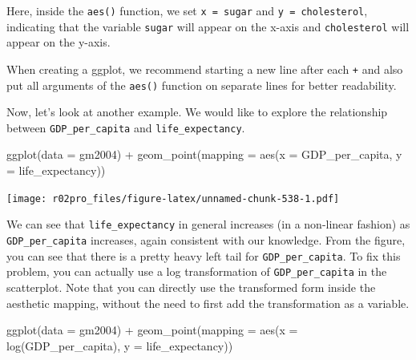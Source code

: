 \documentclass[
]{book}
\newenvironment{Shaded}{\begin{snugshade}}{\end{snugshade}}
\newcommand{\AttributeTok}[1]{\textcolor[rgb]{0.77,0.63,0.00}{#1}}
\newcommand{\FunctionTok}[1]{\textcolor[rgb]{0.00,0.00,0.00}{#1}}
\newcommand{\NormalTok}[1]{#1}
\newcommand{\SpecialCharTok}[1]{\textcolor[rgb]{0.00,0.00,0.00}{#1}}
\newenvironment{blackbox}{
  \definecolor{shadecolor}{rgb}{0, 0, 0}  %
  \color{white}
  \begin{shaded}}
 {\end{shaded}}
\newenvironment{infobox}[1]
  {
  \begin{itemize}
  \renewcommand{\labelitemi}{
    \raisebox{-.7\height}[0pt][0pt]{
      {\setkeys{Gin}{width=3em,keepaspectratio}
        \texttt{[image: pics/\#1]}}
    }
  }
  \setlength{\fboxsep}{1em}
  \begin{blackbox}
  \item
  }
  {
  \end{blackbox}
  \end{itemize}
  }
\begin{document}
Here, inside the \texttt{aes()} function, we set \texttt{x\ =\ sugar} and \texttt{y\ =\ cholesterol}, indicating that the variable \texttt{sugar} will appear on the x-axis and \texttt{cholesterol} will appear on the y-axis.

\begin{infobox}{caution}
When creating a ggplot, we recommend starting a new line after each \texttt{+} and also put all arguments of the \texttt{aes()} function on separate lines for better readability.

\end{infobox}

Now, let's look at another example. We would like to explore the relationship between \texttt{GDP\_per\_capita} and \texttt{life\_expectancy}.

\begin{Shaded}
\begin{Highlighting}[]
\FunctionTok{ggplot}\NormalTok{(}\AttributeTok{data =}\NormalTok{ gm2004) }\SpecialCharTok{+} 
  \FunctionTok{geom\_point}\NormalTok{(}\AttributeTok{mapping =} \FunctionTok{aes}\NormalTok{(}\AttributeTok{x =}\NormalTok{ GDP\_per\_capita, }
                           \AttributeTok{y =}\NormalTok{ life\_expectancy))}
\end{Highlighting}
\end{Shaded}

\texttt{[image: r02pro\_files/figure-latex/unnamed-chunk-538-1.pdf]}

We can see that \texttt{life\_expectancy} in general increases (in a non-linear fashion) as \texttt{GDP\_per\_capita} increases, again consistent with our knowledge. From the figure, you can see that there is a pretty heavy left tail for \texttt{GDP\_per\_capita}. To fix this problem, you can actually use a log transformation of \texttt{GDP\_per\_capita} in the scatterplot. Note that you can directly use the transformed form inside the aesthetic mapping, without the need to first add the transformation as a variable.

\begin{Shaded}
\begin{Highlighting}[]
\FunctionTok{ggplot}\NormalTok{(}\AttributeTok{data =}\NormalTok{ gm2004) }\SpecialCharTok{+} 
  \FunctionTok{geom\_point}\NormalTok{(}\AttributeTok{mapping =} \FunctionTok{aes}\NormalTok{(}\AttributeTok{x =} \FunctionTok{log}\NormalTok{(GDP\_per\_capita), }
                           \AttributeTok{y =}\NormalTok{ life\_expectancy))}
\end{Highlighting}
\end{Shaded}
\end{document}
